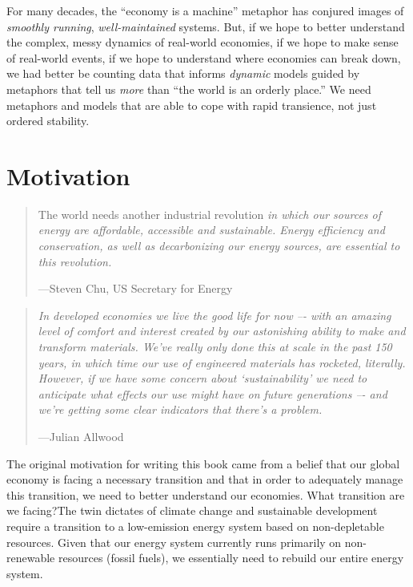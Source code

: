 For many decades, the ``economy is a machine'' metaphor
has conjured images of \emph{smoothly running}, \emph{well-maintained} systems.
But, if we hope to better understand the complex, messy dynamics of real-world economies, 
if we hope to make sense of real-world events,
if we hope to understand where economies can break down,
we had better be counting data that informs \emph{dynamic} models 
guided by metaphors that tell us \emph{more} than ``the world is an orderly place.''
We need metaphors and models that are
able to cope with rapid transience,
not just ordered stability.


\section{Motivation}
\label{sec:motivation}

\begin{quotation}
The world needs another industrial revolution 
\emph{in which our sources of energy are affordable, 
accessible and sustainable. 
Energy efficiency and conservation, 
as well as decarbonizing our energy sources, 
are essential to this revolution.}~\cite[p.~294]{Chu2012}\\
\begin{flushright}
---Steven Chu, US Secretary for Energy
\end{flushright}
\end{quotation}


\begin{quotation}
\emph{In developed economies we live the good life for now –-
with an amazing level of comfort and interest 
created by our astonishing ability to 
make and transform materials. 
We've really only done this at scale in the past 150 years, 
in which time our use of engineered materials has rocketed, 
literally. 
However, if we have some concern about `sustainability' 
we need to anticipate what effects our use might have 
on future generations –-
and we're getting some clear indicators that there's a 
problem.}~\cite[p.~3]{allwood2012sustainable}
\begin{flushright}
---Julian Allwood
\end{flushright}
\end{quotation}

The original motivation for writing this book
came from a belief that our global economy is
facing a necessary transition and that in order
to adequately manage this transition,
we need to better understand our economies.
What transition are we facing?The twin dictates of climate change and 
sustainable development require a transition to a
low-emission energy system based on 
non-depletable resources. 
Given that our energy system currently runs
primarily on non-renewable resources (fossil fuels),
we essentially need to rebuild our entire energy
system.

